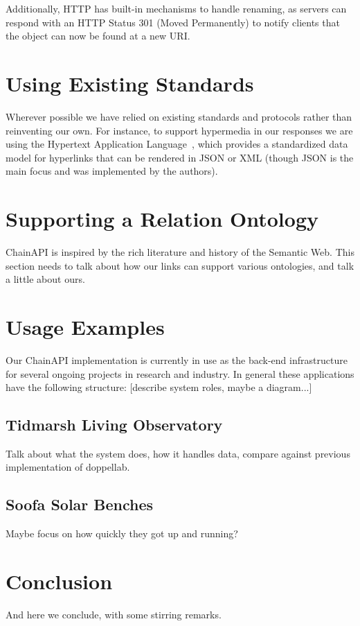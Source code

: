 \documentclass{acm_proc_article-sp}
\begin{document}
Additionally, HTTP has built-in mechanisms to handle renaming, as servers can
respond with an HTTP Status 301 (Moved Permanently) to notify clients that the
object can now be found at a new URI.

\section{Using Existing Standards}

Wherever possible we have relied on existing standards and protocols rather
than reinventing our own. For instance, to support hypermedia in our responses
we are using the Hypertext Application Language~\cite{json-hal-draft}, which
provides a standardized data model for hyperlinks that can be rendered in JSON
or XML (though JSON is the main focus and was implemented by the authors).

\section{Supporting a Relation Ontology}

ChainAPI is inspired by the rich literature and history of the Semantic Web.
This section needs to talk about how our links can support various ontologies,
and talk a little about ours.

\section{Usage Examples}

Our ChainAPI implementation is currently in use as the back-end infrastructure
for several ongoing projects in research and industry. In general these applications
have the following structure: [describe system roles, maybe a diagram...]

\subsection{Tidmarsh Living Observatory}

Talk about what the system does, how it handles data, compare against previous
implementation of doppellab.

\subsection{Soofa Solar Benches}

Maybe focus on how quickly they got up and running?

\section{Conclusion}
And here we conclude, with some stirring remarks.
\end{document}

